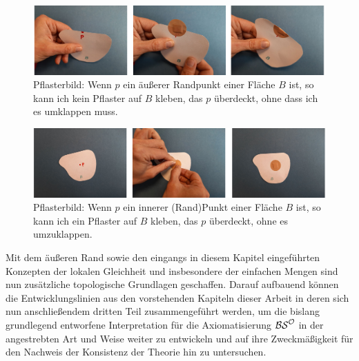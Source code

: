     \begin{figure}[ht]
        \centering
        \includegraphics[width=\textwidth]{abb/pflasterbild-aeusserer-rand.png}
        \caption[Pflasterbild: äußerer Randpunkt]{Pflasterbild: Wenn $p$ ein äußerer Randpunkt einer Fläche $B$ ist, so kann ich kein Pflaster auf $B$ kleben, das $p$ überdeckt, ohne dass ich es umklappen muss.}
        \label{fig:pflasterbild-aeusserer-rand}
    \end{figure}
    
    \begin{figure}[ht]
        \centering
        \includegraphics[width=\textwidth]{abb/pflasterbild-innerer-pkt.png}
        \caption[Pflasterbild: innerer Punkt]{Pflasterbild: Wenn $p$ ein innerer (Rand)Punkt einer Fläche $B$ ist, so kann ich ein Pflaster auf $B$ kleben, das $p$ überdeckt, ohne es umzuklappen.}
        \label{fig:pflasterbild-innerer-pkt}
    \end{figure}
    

\bigskip \noindent
Mit dem äußeren Rand sowie den eingangs in diesem Kapitel eingeführten Konzepten der lokalen Gleichheit und insbesondere der einfachen Mengen sind nun zusätzliche topologische Grundlagen geschaffen. Darauf aufbauend können die Entwicklungslinien aus den vorstehenden Kapiteln dieser Arbeit in deren sich nun anschließendem dritten Teil zusammengeführt werden, um die bislang grundlegend entworfene Interpretation für die Axiomatisierung $\mathcal{BS}^{\mathcal{O}}$ in der angestrebten Art und Weise weiter zu entwickeln und auf ihre Zweckmäßigkeit für den Nachweis der Konsistenz der Theorie hin zu untersuchen.

    

    
